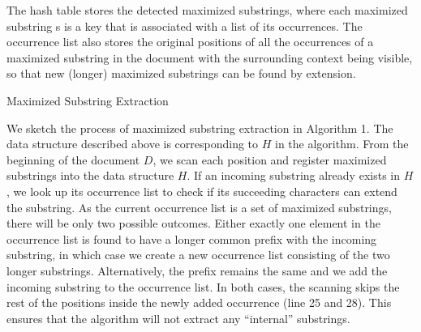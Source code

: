 \documentclass[english]{jnlp_1.4}
\begin{document}
The hash table stores the detected maximized substrings, where each maximized substring s is a key that is associated with a list of its occurrences. The occurrence list also stores the original positions of all the occurrences of a maximized substring in the document with the surrounding context being visible, so that new (longer) maximized substrings can be found by extension. 

\begin{algorithm}[t]

\caption{\label{alg:seeifrelin} Maximized Substring Extraction}
\end{algorithm}

We sketch the process of maximized substring extraction in Algorithm 1. The data structure described above is corresponding to $H$ in the algorithm. From the beginning of the document $D$, we scan each position and register maximized substrings into the data structure $H$. If an incoming substring already exists in $H$, we look up its occurrence list to check if its succeeding characters can extend the substring. As the current occurrence list is a set of maximized substrings, there will be only two possible outcomes. Either exactly one element in the occurrence list is found to have a longer common prefix with the incoming substring, in which case we create a new occurrence list consisting of the two longer substrings. Alternatively, the prefix remains the same and we add the incoming substring to the occurrence list. In both cases, the scanning skips the rest of the positions inside the newly added occurrence (line 25 and 28). This ensures that the algorithm will not extract any ``internal'' substrings.
\end{document}
